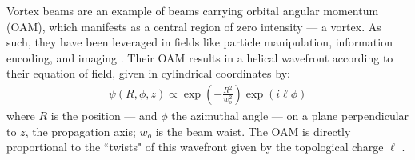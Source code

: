 \documentclass[10pt,a4paper,twoside]{article}
\renewcommand{\P}[1]{\left( #1 \right)}
\renewcommand{\l}{\ell}
\begin{document}




Vortex beams are an example of beams carrying orbital angular momentum (OAM), which manifests as a central region of zero intensity --- a vortex. As such, they have been leveraged in fields like particle manipulation, information encoding, and imaging \cite{rev-trap}. 
Their OAM results in a helical wavefront according to their equation of field, given in cylindrical coordinates by: \cite{rev}
\begin{align}
    \psi(R,\phi, z) \propto \exp\P{-\frac{R^2}{w_o^2}} \exp(i\l\phi)
\end{align}
where $R$ is the position --- and $\phi$ the azimuthal angle --- on a plane perpendicular to $z$, the propagation axis; $w_o$ is the beam waist. The OAM is directly proportional to the ``twists" of this wavefront given by the topological charge $\l$ \cite{alperin, twisted}.
\end{document}
